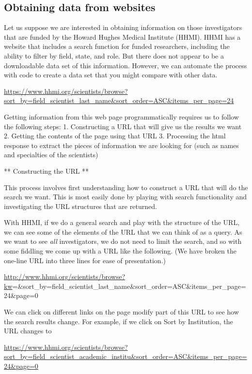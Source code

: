 \documentclass[]{krantz}
\begin{document}
\subsection{Obtaining data from
websites}\label{obtaining-data-from-websites}

Let us suppose we are interested in obtaining information on those
investigators that are funded by the Howard Hughes Medical Institute
(HHMI). HHMI has a website that includes a search function for funded
researchers, including the ability to filter by field, state, and role.
But there does not appear to be a downloadable data set of this
information. However, we can automate the process with code to create a
data set that you might compare with other data.

\url{https://www.hhmi.org/scientists/browse?sort_by=field_scientist_last_name\&sort_order=ASC\&items_per_page=24}

Getting information from this web page programmatically requires us to
follow the following steps: 1. Constructing a URL that will give us the
results we want 2. Getting the contents of the page using that URL 3.
Processing the html response to extract the pieces of information we are
looking for (such as names and specialties of the scientists)

** Constructing the URL **

This process involves first understanding how to construct a URL that
will do the search we want. This is most easily done by playing with
search functionality and investigating the URL structures that are
returned.

With HHMI, if we do a general search and play with the structure of the
URL, we can see some of the elements of the URL that we can think of as
a query. As we want to see \emph{all} investigators, we do not need to
limit the search, and so with some fiddling we come up with a URL like
the following. (We have broken the one-line URL into three lines for
ease of presentation.)

\url{http://www.hhmi.org/scientists/browse?kw}=\&sort\_by=field\_scientist\_last\_name\&sort\_order=ASC\&items\_per\_page=24\&page=0

We can click on different links on the page modify part of this URL to
see how the search results change. For example, if we click on Sort by
Institution, the URL changes to

\url{https://www.hhmi.org/scientists/browse?sort_by=field_scientist_academic_institu\&sort_order=ASC\&items_per_page=24\&page=0}
\end{document}
